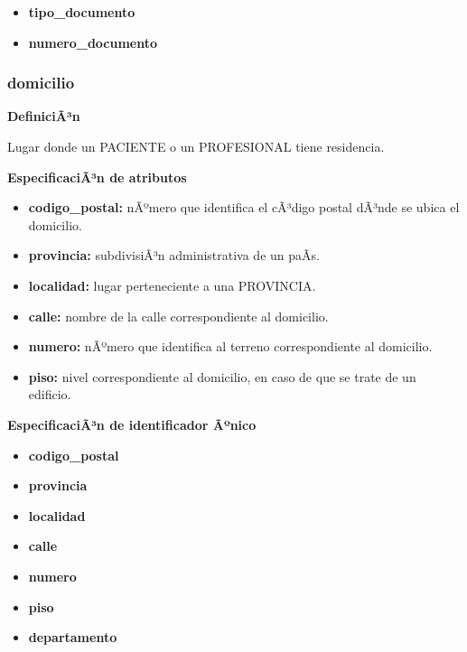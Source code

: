 \documentclass[a4paper,11pt]{article}
\begin{document}
\begin{itemize}

    \item \textbf{tipo\_documento}

    \item \textbf{numero\_documento}

\end{itemize}

\subsubsection{\textbf{domicilio}}

\textbf{DefiniciÃ³n}

Lugar donde un PACIENTE o un PROFESIONAL tiene residencia.

\textbf{EspecificaciÃ³n de atributos}

\begin{itemize}

     \item \textbf{codigo\_postal:} nÃºmero que identifica el cÃ³digo postal dÃ³nde se ubica el domicilio.

     \item \textbf{provincia:} subdivisiÃ³n administrativa de un paÃ­s.

     \item \textbf{localidad:} lugar perteneciente a una PROVINCIA.

     \item \textbf{calle:} nombre de la calle correspondiente al domicilio.

     \item \textbf{numero:} nÃºmero que identifica al terreno correspondiente al domicilio.

     \item \textbf{piso:} nivel correspondiente al domicilio, en caso de que se trate de un edificio.
\end{itemize}

\textbf{EspecificaciÃ³n de identificador Ãºnico}

\begin{itemize}

     \item \textbf{codigo\_postal}

     \item \textbf{provincia}

     \item \textbf{localidad}

     \item \textbf{calle}

     \item \textbf{numero}

     \item \textbf{piso}

     \item \textbf{departamento}

\end{itemize}
\end{document}

